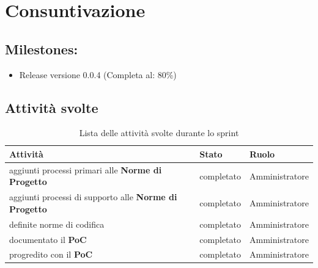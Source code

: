 \section{Consuntivazione}

\subsection{Milestones:}
\begin{itemize}
    \item Release versione 0.0.4 (Completa al: 80\%)
\end{itemize}

\subsection{Attività svolte}

\begin{table}[ht]
    \begin{tabularx}{\textwidth}{X l l}
        
        \rowcolor{gray!30} \textbf{Attività} & \textbf{Stato} & \textbf{Ruolo}\\
        
        \hline
        aggiunti processi primari alle \textbf{Norme di Progetto} & completato & Amministratore\\
        aggiunti processi di supporto alle \textbf{Norme di Progetto} & completato & Amministratore\\
        definite norme di codifica & completato & Amministratore\\
        documentato il \textbf{PoC} & completato & Amministratore\\
        progredito con il \textbf{PoC}& completato & Amministratore\\
        \end{tabularx}
    \caption{Lista delle attività svolte durante lo sprint}
\end{table}


